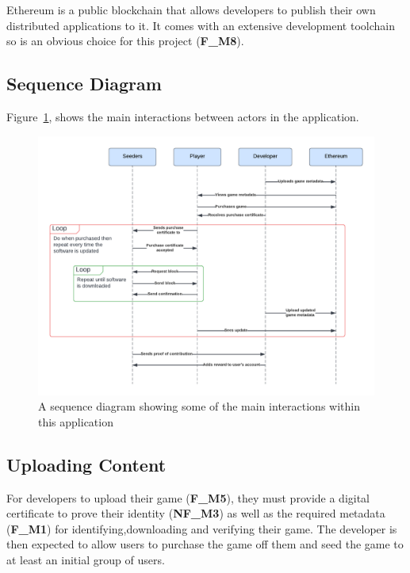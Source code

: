 \vspace{2mm}\noindent Ethereum is a public blockchain that allows developers to publish their own distributed applications to it. It comes with an extensive development toolchain so is an obvious choice for this project (\textbf{F\_M8}).

\subsection*{Sequence Diagram}

Figure~\ref{fig:sequence-diagram}, shows the main interactions between actors in the application.

\begin{figure}[ht]
  \centering
  \includegraphics[width=.95\textwidth]{assets/images/diagrams/seqeunce-diagram.png}
  \caption{A sequence diagram showing some of the main interactions within this application}
  \label{fig:sequence-diagram}
\end{figure}

\subsection*{Uploading Content}
\label{subsec:upload-content}

For developers to upload their game (\textbf{F\_M5}), they must provide a digital certificate to prove their identity (\textbf{NF\_M3}) as well as the required metadata (\textbf{F\_M1}) for identifying,downloading and verifying their game. 
The developer is then expected to allow users to purchase the game off them and seed the game to at least an initial group of users.

